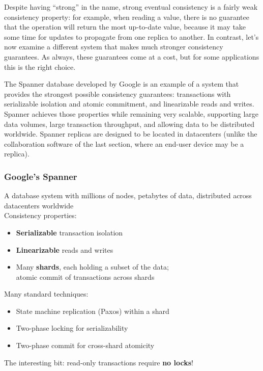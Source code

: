 Despite having ``strong'' in the name, strong eventual consistency is a fairly weak consistency property: for example, when reading a value, there is no guarantee that the operation will return the most up-to-date value, because it may take some time for updates to propagate from one replica to another.
In contrast, let's now examine a different system that makes much stronger consistency guarantees.
As always, these guarantees come at a cost, but for some applications this is the right choice.

The Spanner database developed by Google \citep{Corbett:2012} is an example of a system that provides the strongest possible consistency guarantees: transactions with serializable isolation and atomic commitment, and linearizable reads and writes.
Spanner achieves those properties while remaining very scalable, supporting large data volumes, large transaction throughput, and allowing data to be distributed worldwide.
Spanner replicas are designed to be located in datacenters (unlike the collaboration software of the last section, where an end-user device may be a replica).

\begin{frame}
    \label{s:spanner-intro}
    \frametitle{Google's Spanner}
    A database system with millions of nodes, petabytes of data, distributed across datacenters worldwide\\[1em]\pause
    Consistency properties:
    \begin{itemize}
        \item \textbf{Serializable} transaction isolation
        \item \textbf{Linearizable} reads and writes\pause
        \item Many \textbf{shards}, each holding a subset of the data;\\atomic commit of transactions across shards\\[1em]\pause
    \end{itemize}
    Many standard techniques:
    \begin{itemize}
        \item State machine replication (Paxos) within a shard
        \item Two-phase locking for serializability
        \item Two-phase commit for cross-shard atomicity\\[1em]\pause
    \end{itemize}
    The interesting bit: read-only transactions require \textbf{no locks}!
\end{frame}
\label{l:spanner-intro}

